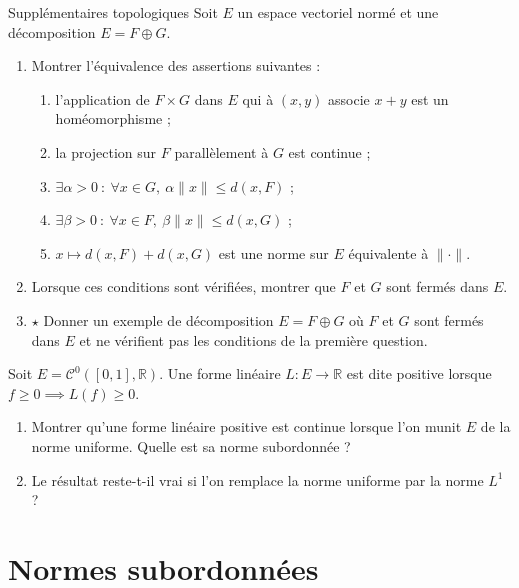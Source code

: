 \documentclass[french,a4paper]{article}
\newcommand{\R}{\mathbb{R}}
\theoremstyle{plain}
\theoremstyle{definition}
\theoremstyle{remark}
\begin{document}
\begin{ex}{Supplémentaires topologiques}
	Soit $E$ un espace vectoriel normé et une décomposition $E=F\oplus G$.
	\begin{enumerate}
		\item Montrer l'équivalence des assertions suivantes :
		\begin{enumerate}[label=(\roman*)]
			\item l'application de $F\times G$ dans $E$ qui à $(x,y)$ associe $x+y$ est un homéomorphisme ;
			\item la projection sur $F$ parallèlement à $G$ est continue ;
			\item $\exists\alpha>0\ : \ \forall x\in G,\ \alpha\lVert x\rVert \leqslant d(x,F)$ ;
			\item $\exists\beta>0\ : \ \forall x\in F,\ \beta\lVert x\rVert \leqslant d(x,G)$ ;
			\item $x\mapsto d(x,F)+d(x,G)$ est une norme sur $E$ équivalente à $\lVert\cdot\rVert$.
		\end{enumerate}
		\item Lorsque ces conditions sont vérifiées, montrer que $F$ et $G$ sont fermés dans $E$.
		\item $\star$ Donner un exemple de décomposition $E=F\oplus G$ où $F$ et $G$ sont fermés dans $E$ et ne vérifient pas les conditions de la première question.
	\end{enumerate}
\end{ex}

\begin{ex}{}
	Soit $E=\mathcal{C}^0([0,1],\R)$. Une forme linéaire $L:E\to\R$ est dite positive lorsque $f\geqslant 0\implies L(f)\geqslant0$.
	\begin{enumerate}
		\item Montrer qu'une forme linéaire positive est continue lorsque l'on munit $E$ de la norme uniforme. Quelle est sa norme subordonnée ?
		\item Le résultat reste-t-il vrai si l'on remplace la norme uniforme par la norme $L^1$ ?
	\end{enumerate}
\end{ex}

\section{Normes subordonnées}
\end{document}
